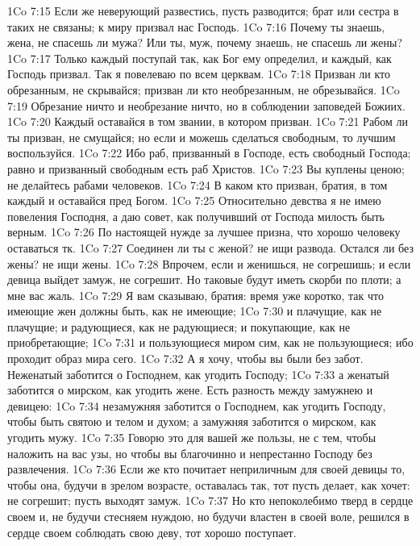 \vs 1Co 7:15 Если же неверующий  развестись, пусть разводится; брат или сестра в таких  не связаны; к миру призвал нас Господь.
\vs 1Co 7:16 Почему ты знаешь, жена, не спасешь ли мужа? Или ты, муж, почему знаешь, не спасешь ли жены?
\vs 1Co 7:17 Только каждый поступай так, как Бог ему определил, и каждый, как Господь призвал. Так я повелеваю по всем церквам.
\vs 1Co 7:18 Призван ли кто обрезанным, не скрывайся; призван ли кто необрезанным, не обрезывайся.
\vs 1Co 7:19 Обрезание ничто и необрезание ничто, но  в соблюдении заповедей Божиих.
\vs 1Co 7:20 Каждый оставайся в том звании, в котором призван.
\vs 1Co 7:21 Рабом ли ты призван, не смущайся; но если и можешь сделаться свободным, то лучшим воспользуйся.
\vs 1Co 7:22 Ибо раб, призванный в Господе, есть свободный Господа; равно и призванный свободным есть раб Христов.
\vs 1Co 7:23 Вы куплены  ценою; не делайтесь рабами человеков.
\vs 1Co 7:24 В каком  кто призван, братия, в том каждый и оставайся пред Богом.
\rsbpar\vs 1Co 7:25 Относительно девства я не имею повеления Господня, а даю совет, как получивший от Господа милость быть  верным.
\vs 1Co 7:26 По настоящей нужде за лучшее призна, что хорошо человеку оставаться тк.
\vs 1Co 7:27 Соединен ли ты с женой? не ищи развода. Остался ли без жены? не ищи жены.
\vs 1Co 7:28 Впрочем, если и женишься, не согрешишь; и если девица выйдет замуж, не согрешит. Но таковые будут иметь скорби по плоти; а мне вас жаль.
\rsbpar\vs 1Co 7:29 Я вам сказываю, братия: время уже коротко, так что имеющие жен должны быть, как не имеющие;
\vs 1Co 7:30 и плачущие, как не плачущие; и радующиеся, как не радующиеся; и покупающие, как не приобретающие;
\vs 1Co 7:31 и пользующиеся миром сим, как не пользующиеся; ибо проходит образ мира сего.
\vs 1Co 7:32 А я хочу, чтобы вы были без забот. Неженатый заботится о Господнем, как угодить Господу;
\vs 1Co 7:33 а женатый заботится о мирском, как угодить жене. Есть разность между замужнею и девицею:
\vs 1Co 7:34 незамужняя заботится о Господнем, как угодить Господу, чтобы быть святою и телом и духом; а замужняя заботится о мирском, как угодить мужу.
\vs 1Co 7:35 Говорю это для вашей же пользы, не с тем, чтобы наложить на вас узы, но чтобы вы благочинно и непрестанно  Господу без развлечения.
\vs 1Co 7:36 Если же кто почитает неприличным для своей девицы то, чтобы она, будучи в зрелом возрасте, оставалась так, тот пусть делает, как хочет: не согрешит; пусть  выходят замуж.
\vs 1Co 7:37 Но кто непоколебимо тверд в сердце своем и, не будучи стесняем нуждою, но будучи властен в своей воле, решился в сердце своем соблюдать свою деву, тот хорошо поступает.
